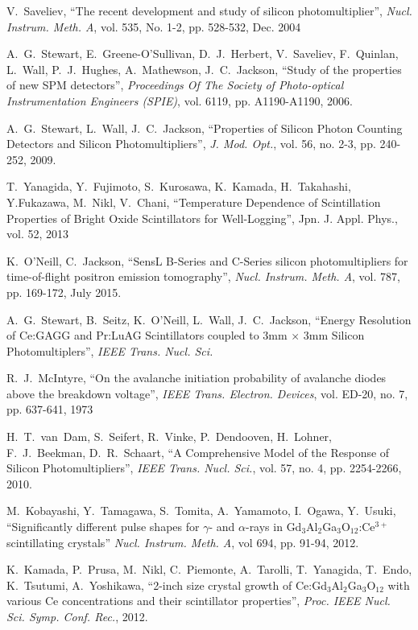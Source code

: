 \documentclass[journal]{IEEEtran}
\begin{document}
\begin{thebibliography}{1}
V.~Saveliev, ``The recent development and study of silicon photomultiplier'', \emph{Nucl. Instrum. Meth. A}, vol. 535, No. 1-2, pp. 528-532, Dec. 2004

A.~G.~Stewart, E.~Greene-O'Sullivan, D.~J.~Herbert, V.~Saveliev, F.~Quinlan, L.~Wall, P.~J.~Hughes, A.~Mathewson, J.~C.~Jackson, ``Study of the properties of new SPM detectors'', \emph{Proceedings Of The Society of Photo-optical Instrumentation Engineers (SPIE)}, vol. 6119, pp. A1190-A1190, 2006.

A.~G.~Stewart, L.~Wall, J.~C.~Jackson, ``Properties of Silicon Photon Counting Detectors and Silicon Photomultipliers'', \emph{J. Mod. Opt.}, vol. 56, no. 2-3, pp. 240-252, 2009.

T.~Yanagida, Y.~Fujimoto, S.~Kurosawa, K.~Kamada, H.~Takahashi, Y.Fukazawa, M.~Nikl, V.~Chani, ``Temperature Dependence of Scintillation Properties of Bright Oxide Scintillators for Well-Logging'', Jpn. J. Appl. Phys., vol. 52, 2013

K.~O'Neill, C.~Jackson, ``SensL B-Series and C-Series silicon photomultipliers for time-of-flight positron emission tomography'', \emph{Nucl. Instrum. Meth. A}, vol. 787, pp. 169-172, July 2015.

A.~G.~Stewart, B.~Seitz, K.~O'Neill, L.~Wall, J.~C.~Jackson, ``Energy Resolution of Ce:GAGG and Pr:LuAG Scintillators coupled to 3mm $\times$ 3mm Silicon Photomultiplers'', \emph{IEEE Trans. Nucl. Sci.}

R.~J.~McIntyre, ``On the avalanche initiation probability of avalanche diodes above the  breakdown voltage'', \emph{IEEE Trans. Electron. Devices}, vol. ED-20, no. 7, pp. 637-641, 1973

H.~T.~van~Dam, S.~Seifert, R.~Vinke, P.~Dendooven, H.~Lohner, F.~J.~Beekman, D.~R.~Schaart, ``A Comprehensive Model of the Response of Silicon Photomultipliers'', \emph{IEEE Trans. Nucl. Sci.}, vol. 57, no. 4, pp. 2254-2266, 2010.

M.~Kobayashi, Y.~Tamagawa, S.~Tomita, A.~Yamamoto, I.~Ogawa, Y.~Usuki, ``Significantly different pulse shapes for $\gamma$- and $\alpha$-rays in Gd$_{3}$Al$_{2}$Ga$_{3}$O$_{12}$:Ce$^{3+}$ scintillating crystals'' \emph{Nucl. Instrum. Meth. A}, vol 694, pp. 91-94, 2012.

K.~Kamada, P.~Prusa, M.~Nikl, C.~Piemonte, A.~Tarolli, T.~Yanagida, T.~Endo, K.~Tsutumi, A.~Yoshikawa, ``2-inch size crystal growth of Ce:Gd$_{3}$Al$_{2}$Ga$_{3}$O$_{12}$ with various Ce concentrations and their scintillator properties'', \emph{Proc. IEEE Nucl. Sci. Symp. Conf. Rec.}, 2012. 


\end{thebibliography}
\end{document}

